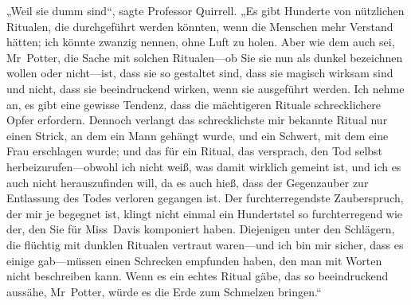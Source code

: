 „Weil sie dumm sind“, sagte Professor Quirrell. „Es gibt Hunderte von nützlichen Ritualen, die durchgeführt werden könnten, wenn die Menschen mehr Verstand hätten; ich könnte zwanzig nennen, ohne Luft zu holen. Aber wie dem auch sei, Mr~Potter, die Sache mit solchen Ritualen—ob Sie sie nun als dunkel bezeichnen wollen oder nicht—ist, dass sie so gestaltet sind, dass sie magisch wirksam sind und nicht, dass sie beeindruckend wirken, wenn sie ausgeführt werden. Ich nehme an, es gibt eine gewisse Tendenz, dass die mächtigeren Rituale schrecklichere Opfer erfordern. Dennoch verlangt das schrecklichste mir bekannte Ritual nur einen Strick, an dem ein Mann gehängt wurde, und ein Schwert, mit dem eine Frau erschlagen wurde; und das für ein Ritual, das versprach, den Tod selbst herbeizurufen—obwohl ich nicht weiß, was damit wirklich gemeint ist, und ich es auch nicht herauszufinden will, da es auch hieß, dass der Gegenzauber zur Entlassung des Todes verloren gegangen ist. Der furchterregendste Zauberspruch, der mir je begegnet ist, klingt nicht einmal ein Hundertstel so furchterregend wie der, den Sie für Miss~Davis komponiert haben. Diejenigen unter den Schlägern, die flüchtig mit dunklen Ritualen vertraut waren—und ich bin mir sicher, dass es einige gab—müssen einen Schrecken empfunden haben, den man mit Worten nicht beschreiben kann. Wenn es ein echtes Ritual gäbe, das so beeindruckend aussähe, Mr~Potter, würde es die Erde zum Schmelzen bringen.“

